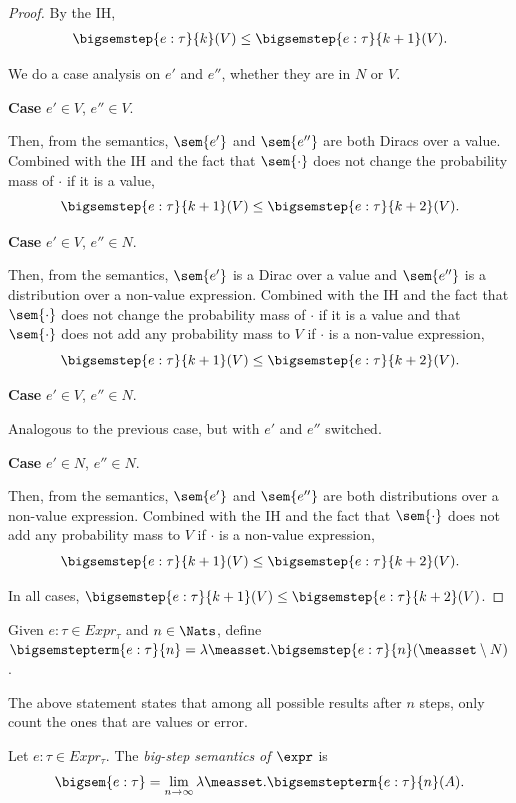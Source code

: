 \begin{proof}
	By the IH,
	\begin{align*}
		\bigsemstep{e : \tau}{k}(V) \leq \bigsemstep{e : \tau}{k+1}(V).
	\end{align*}

	We do a case analysis on $e'$ and $e''$, whether they are in $N$ or $V$.

	\textbf{Case} $e' \in V$, $e'' \in V$.

	Then, from the semantics, $\sem{e'}$ and $\sem{e''}$ are both Diracs over a value. Combined with the IH and the fact that $\sem{\cdot}$ does not change the probability mass of $\cdot$ if it is a value, 
	\[
		\bigsemstep{e : \tau}{k+1}(V) \leq \bigsemstep{e : \tau}{k+2}(V).
	\]

	\textbf{Case} $e' \in V$, $e'' \in N$.
	
	Then, from the semantics, $\sem{e'}$ is a Dirac over a value and $\sem{e''}$ is a distribution over a non-value expression. Combined with the IH and the fact that $\sem{\cdot}$ does not change the probability mass of $\cdot$ if it is a value and that $\sem{\cdot}$ does not add any probability mass to $V$ if $\cdot$ is a non-value expression,
	\[
		\bigsemstep{e : \tau}{k+1}(V) \leq \bigsemstep{e : \tau}{k+2}(V).
	\]

	\textbf{Case} $e' \in V$, $e'' \in N$.

	Analogous to the previous case, but with $e'$ and $e''$ switched.

	\textbf{Case} $e' \in N$, $e'' \in N$.

	Then, from the semantics,  $\sem{e'}$ and $\sem{e''}$ are both distributions over a non-value expression. Combined with the IH and the fact that $\sem{\cdot}$ does not add any probability mass to $V$ if $\cdot$ is a non-value expression, 
	\[
		\bigsemstep{e : \tau}{k+1}(V) \leq \bigsemstep{e : \tau}{k+2}(V).
	\]

	In all cases, $\bigsemstep{e : \tau}{k+1}(V) \leq \bigsemstep{e : \tau}{k+2}(V)$.
\end{proof}

Given $e : \tau \in Expr_{\tau}$ and $n\in\Nats$, define $\bigsemstepterm{e : \tau}{n} = \lambda \measset. \bigsemstep{e : \tau}{n}(\measset \setminus N)$. 

The above statement states that among all possible results after $n$ steps, only count the ones that are values or error.

\begin{definition}
	Let $e : \tau \in Expr_{\tau}$. The \emph{big-step semantics of $\expr$} is 
	\[
		\bigsem{e : \tau} = \lim_{n \to \infty} \lambda \measset.
		\bigsemstepterm{e : \tau}{n}(A).
	\]
\end{definition}

